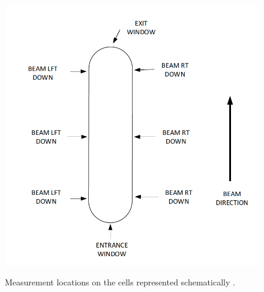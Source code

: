 \documentclass[final,5p,times,twocolumn]{elsarticle}
\begin{document}
\begin{figure}[!h]
  \centering
  \includegraphics[width=\linewidth]{images/tgt_measurements.png}\\
  \caption{Measurement locations on the cells represented schematically \cite{cellconfig}.}
  \label{fig:cellconfig}
\end{figure}

\end{document}
